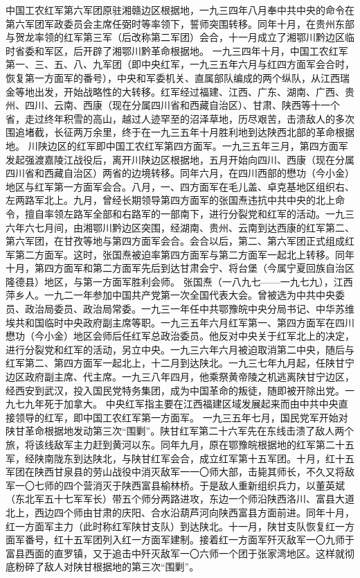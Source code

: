 \begin{maonote}
中国工农红军第六军团原驻湘赣边区根据地，一九三四年八月奉中共中央的命令在第六军团军政委员会主席任弼时等率领下，誓师突围转移。同年十月，在贵州东部与贺龙率领的红军第三军（后改称第二军团）会合，十一月成立了湘鄂川黔边区临时省委和军区，后开辟了湘鄂川黔革命根据地。
一九三四年十月，中国工农红军第一、三、五、八、九军团（即中央红军，一九三五年六月与红四方面军会合时，恢复第一方面军的番号），中央和军委机关、直属部队编成的两个纵队，从江西瑞金等地出发，开始战略性的大转移。红军经过福建、江西、广东、湖南、广西、贵州、四川、云南、西康（现在分属四川省和西藏自治区）、甘肃、陕西等十一个省，走过终年积雪的高山，越过人迹罕至的沼泽草地，历尽艰苦，击溃敌人的多次围追堵截，长征两万余里，终于在一九三五年十月胜利地到达陕西北部的革命根据地。
川陕边区的红军即中国工农红军第四方面军。一九三五年三月，第四方面军发起强渡嘉陵江战役后，离开川陕边区根据地，五月开始向四川、西康（现在分属四川省和西藏自治区）两省的边境转移。同年六月，在四川西部的懋功（今小金）地区与红军第一方面军会合。八月，一、四方面军在毛儿盖、卓克基地区组织右、左两路军北上。九月，曾经长期领导第四方面军的张国焘违抗中共中央的北上命令，擅自率领左路军全部和右路军的一部南下，进行分裂党和红军的活动。一九三六年六七月间，由湘鄂川黔边区突围，经湖南、贵州、云南到达西康的红军第二、第六军团，在甘孜等地与第四方面军会合。会合以后，第二、第六军团正式组成红军第二方面军。这时，张国焘被迫率第四方面军与第二方面军一起北上转移。同年十月，第四方面军和第二方面军先后到达甘肃会宁、将台堡（今属宁夏回族自治区隆德县）地区，与第一方面军胜利会师。
张国焘（一八九七——一九七九），江西萍乡人。一九二一年参加中国共产党第一次全国代表大会。曾被选为中共中央委员、政治局委员、政治局常委。一九三一年任中共鄂豫皖中央分局书记、中华苏维埃共和国临时中央政府副主席等职。一九三五年六月红军第一、第四方面军在四川懋功（今小金）地区会师后任红军总政治委员。他反对中央关于红军北上的决定，进行分裂党和红军的活动，另立中央。一九三六年六月被迫取消第二中央，随后与红军第二、第四方面军一起北上，十二月到达陕北。一九三七年九月起，任陕甘宁边区政府副主席、代主席。一九三八年四月，他乘祭黄帝陵之机逃离陕甘宁边区，经西安到武汉，投入国民党特务集团，成为中国革命的叛徒，随即被开除出党。一九七九年死于加拿大。
中央红军指主要在江西福建区域发展起来而由中共中央直接领导的红军，即中国工农红军第一方面军。
一九三五年七月，国民党军开始对陕甘革命根据地发动第三次“围剿”。陕甘红军第二十六军先在东线击溃了敌人两个旅，将该线敌军主力赶到黄河以东。同年九月，原在鄂豫皖根据地的红军第二十五军，经陕南陇东到达陕北，与陕甘红军会合，成立红军第十五军团。十月，红十五军团在陕西甘泉县的劳山战役中消灭敌军一一〇师大部，击毙其师长，不久又将敌军一〇七师的四个营消灭于陕西富县榆林桥。于是敌人重新组织兵力，以董英斌（东北军五十七军军长）带五个师分两路进攻，东边一个师沿陕西洛川、富县大道北上，西边四个师由甘肃的庆阳、合水沿葫芦河向陕西富县方面前进。同年十月，红一方面军主力（此时称红军陕甘支队）到达陕北。十一月，陕甘支队恢复红一方面军番号，红十五军团列入红一方面军建制。接着红一方面军歼灭敌军一〇九师于富县西面的直罗镇，又于追击中歼灭敌军一〇六师一个团于张家湾地区。这样就彻底粉碎了敌人对陕甘根据地的第三次“围剿”。

\end{maonote}
